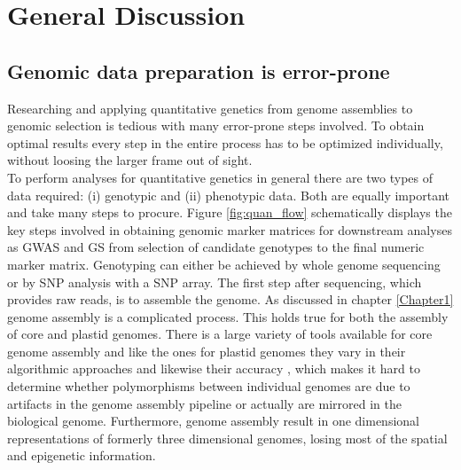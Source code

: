 \chapter{General Discussion} %
\label{Chapter6}
\section{Genomic data preparation is error-prone}

Researching and applying quantitative genetics from genome assemblies to genomic selection
is tedious with many error-prone steps involved. To obtain optimal results every step in
the entire process has to be optimized individually, without loosing the larger frame out
of sight. \\
To perform analyses for quantitative genetics in general there are two types of data
required: (i) genotypic and (ii) phenotypic data. Both are equally important and take many
steps to procure. Figure \ref{fig:quan_flow} schematically displays the key steps involved
in obtaining genomic marker matrices for downstream analyses as GWAS and GS from selection
of candidate genotypes to the final numeric marker matrix. Genotyping can either be
achieved by whole genome sequencing or by SNP analysis with a SNP array.
The first step after sequencing, which provides raw reads, is to assemble the genome. As
discussed in chapter \ref{Chapter1} genome assembly is a complicated process. This holds
true for both the assembly of core and plastid genomes. There is a large variety of tools
available for core genome assembly and like the ones for plastid genomes they vary in
their algorithmic approaches and likewise their accuracy \cite{zhang2011practical}, which
makes it hard to determine whether polymorphisms between individual genomes are due to
artifacts in the genome assembly pipeline or actually are mirrored in the biological
genome. Furthermore, genome assembly result in one dimensional representations of formerly
three dimensional genomes, losing most of the spatial and epigenetic information.

